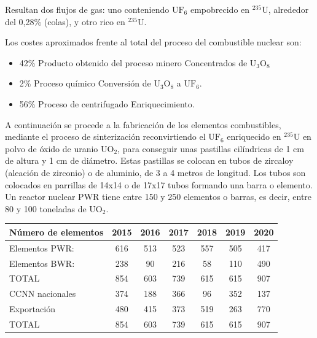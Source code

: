 			
			Resultan dos flujos de gas: uno conteniendo $\text{UF}_6$ empobrecido en $^{235}$U, alrededor del 0,28\% (colas), y otro rico en $^{235}$U.
			
			
			Los costes aproximados frente al total del proceso del combustible nuclear son:
			\begin{itemize}
				\item 42\% Producto obtenido del proceso minero \textrightarrow Concentrados de $\text{U}_3\text{O}_8$
				\item 2\% Proceso químico \textrightarrow Conversión de $\text{U}_3\text{O}_8$ a $\text{UF}_6$.
				\item 56\% Proceso de centrifugado \textrightarrow Enriquecimiento.
			\end{itemize}
			
			
			A continuación se procede a la fabricación de los elementos combustibles, mediante el proceso de sinterización reconvirtiendo el $\text{UF}_6$ enriquecido en $^{235}$U en polvo de óxido de uranio $\text{UO}_2$, para conseguir unas pastillas cilíndricas de 1 cm de altura y 1 cm de diámetro. Estas pastillas se colocan en tubos de zircaloy (aleación de zirconio) o de aluminio, de 3 a 4 metros de longitud. Los tubos son colocados en parrillas de 14x14 o de 17x17 tubos formando una barra o elemento. Un reactor
			nuclear PWR tiene entre 150 y 250 elementos o barras, es decir, entre 80 y 100 toneladas de $\text{UO}_2$.
			
			\begin{table}[H]
				\centering
				\renewcommand{\arraystretch}{1.1}
				\begin{tabular}{lcccccc}
					\hline
					\textbf{Número de elementos} & \textbf{2015} & \textbf{2016} & \textbf{2017} & \textbf{2018} & \textbf{2019} & \textbf{2020}\\
					\hline
					Elementos PWR: & 616 & 513 & 523 & 557 & 505 & 417 \\
					Elementos BWR: & 238&90&216&58&110&490\\ 
					TOTAL&854&603&739&615&615&907\\ 
					\hline
					CCNN nacionales&374&188&366&96&352&
					137\\ 
					Exportación&
					480&
					415&
					373&
					519&
					263&
					770\\ 
					\hline
					TOTAL &
					854 &
					603 &
					739 &
					615 &
					615 &
					907 \\ 
					\hline
				\end{tabular}
			\end{table}
			
